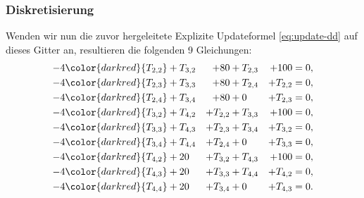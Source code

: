 \subsubsection*{Diskretisierung}
Wenden wir nun die zuvor hergeleitete Explizite Updateformel \eqref{eq:update-dd} auf dieses Gitter an, resultieren die folgenden 9 Gleichungen:
\begin{alignat*}{6}
	-4\color{darkred}{T_{2,2}} &+ T_{3,2} &+ 80 &+ T_{2,3} &+ 100 &= 0, \\
	-4\color{darkred}{T_{2,3}} &+ T_{3,3} &+ 80 &+ T_{2,4} &+ T_{2,2} &= 0, \\
	-4\color{darkred}{T_{2,4}} &+ T_{3,4} &+ 80 &+ 0 &+ T_{2,3} &= 0, \\
	-4\color{darkred}{T_{3,2}} &+ T_{4,2} &+ T_{2,2} &+ T_{3,3} &+ 100 &= 0, \\
	-4\color{darkred}{T_{3,3}} &+ T_{4,3} &+ T_{2,3} &+ T_{3,4} &+ T_{3,2} &= 0, \\
	-4\color{darkred}{T_{3,4}} &+ T_{4,4} &+ T_{2,4} &+ 0 &+ T_{3,3} &= 0, \\
	-4\color{darkred}{T_{4,2}} &+ 20 &+ T_{3,2} &+ T_{4,3} &+ 100 &= 0, \\
	-4\color{darkred}{T_{4,3}} &+ 20 &+ T_{3,3} &+ T_{4,4} &+ T_{4,2} &= 0, \\
	-4\color{darkred}{T_{4,4}} &+ 20 &+ T_{3,4} &+ 0 &+ T_{4,3} &= 0.
\end{alignat*}

